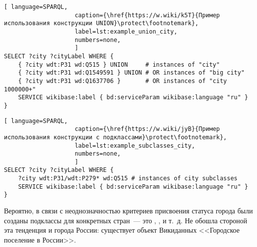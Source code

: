 \begin{lstlisting}[ language=SPARQL, 
                    caption={\href{https://w.wiki/k5T}{Пример использования конструкции UNION}\protect\footnotemark},
                    label=lst:example_union_city,
                    numbers=none,
                    ]
SELECT ?city ?cityLabel WHERE {
    { ?city wdt:P31 wd:Q515 } UNION     # instances of "city"            
    { ?city wdt:P31 wd:Q1549591 } UNION # OR instances of "big city"               
    { ?city wdt:P31 wd:Q1637706 }       # OR instances of "city 1000000+"
    SERVICE wikibase:label { bd:serviceParam wikibase:language "ru" }
}
\end{lstlisting}




\newpage
\begin{lstlisting}[ language=SPARQL, 
                    caption={\href{https://w.wiki/jyB}{Пример использования конструкции с подклассами}\protect\footnotemark},
                    label=lst:example_subclasses_city,
                    numbers=none,
                    ]
SELECT ?city ?cityLabel WHERE {
    ?city wdt:P31/wdt:P279* wd:Q515 # instances of city subclasses
    SERVICE wikibase:label { bd:serviceParam wikibase:language "ru" }
}
\end{lstlisting}

Вероятно, в связи с неоднозначностью критериев присвоения статуса города 
были созданы подклассы для конкретных стран~--- это , 
,  и т.~д. 
Не обошла стороной эта тенденция и города России: 
существует объект Викиданных <<Городское поселение в России>>.


